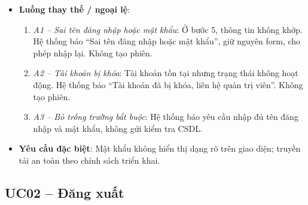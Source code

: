 \begin{itemize}[leftmargin=1.5cm]
\begin{enumerate}
        \item Hệ thống ghi log đăng nhập thành công.
        \item Hệ thống chuyển hướng sang trang chủ tương ứng vai trò (QTV / QL / NV).
    \end{enumerate}
    \item \textbf{Luồng thay thế / ngoại lệ}:
    \begin{enumerate}
        \item \textit{A1 -- Sai tên đăng nhập hoặc mật khẩu}: Ở bước 5, thông tin không khớp. Hệ thống báo ``Sai tên đăng nhập hoặc mật khẩu'', giữ nguyên form, cho phép nhập lại. Không tạo phiên.
        \item \textit{A2 -- Tài khoản bị khóa}: Tài khoản tồn tại nhưng trạng thái không hoạt động. Hệ thống báo ``Tài khoản đã bị khóa, liên hệ quản trị viên''. Không tạo phiên.
        \item \textit{A3 -- Bỏ trống trường bắt buộc}: Hệ thống báo yêu cầu nhập đủ tên đăng nhập và mật khẩu, không gửi kiểm tra CSDL.
    \end{enumerate}
    \item \textbf{Yêu cầu đặc biệt}: Mật khẩu không hiển thị dạng rõ trên giao diện; truyền tải an toàn theo chính sách triển khai.
\end{itemize}

\subsection{UC02 -- Đăng xuất}

